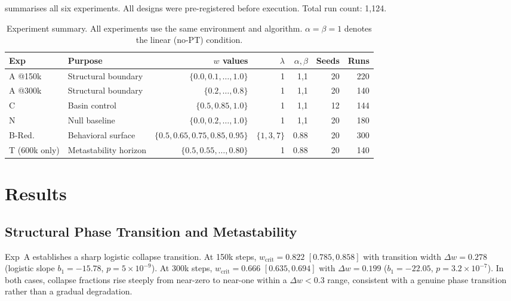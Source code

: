 \documentclass[11pt]{article}
\newcommand{\wcrit}{w_{\mathrm{crit}}}
\begin{document}
 summarises all six experiments.
All designs were pre-registered before execution.
Total run count: 1,124.

\begin{table}[t]
\centering
\caption{Experiment summary. All experiments use the same environment and
algorithm.  $\alpha{=}\beta{=}1$ denotes the linear (no-PT) condition.}
\label{tab:experiments}
\small
\begin{tabular}{llrrrrr}
\toprule
Exp & Purpose & $w$ values & $\lambda$ & $\alpha,\beta$ & Seeds & Runs \\
\midrule
A @150k  & Structural boundary  & $\{0.0, 0.1,\ldots, 1.0\}$ & 1 & 1,1 & 20 & 220 \\
A @300k  & Structural boundary  & $\{0.2,\ldots, 0.8\}$       & 1 & 1,1 & 20 & 140 \\
C        & Basin control        & $\{0.5, 0.85, 1.0\}$        & 1 & 1,1 & 12 & 144 \\
N        & Null baseline        & $\{0.0, 0.2,\ldots, 1.0\}$  & 1 & 1,1 & 20 & 180 \\
B-Red.   & Behavioral surface   & $\{0.5, 0.65, 0.75, 0.85, 0.95\}$ & $\{1,3,7\}$ & 0.88 & 20 & 300 \\
T (600k only) & Metastability horizon & $\{0.5, 0.55,\ldots, 0.80\}$ & 1 & 0.88 & 20 & 140 \\
\bottomrule
\end{tabular}
\end{table}

\section{Results}
\label{sec:results}

\subsection{Structural Phase Transition and Metastability}
\label{sec:results_structural}

Exp~A establishes a sharp logistic collapse transition.
At 150k steps, $\wcrit = 0.822$ $[0.785, 0.858]$ with transition width
$\Delta w = 0.278$ (logistic slope $b_1 = -15.78$, $p = 5 \times 10^{-9}$).
At 300k steps, $\wcrit = 0.666$ $[0.635, 0.694]$ with $\Delta w = 0.199$
($b_1 = -22.05$, $p = 3.2 \times 10^{-7}$).
In both cases, collapse fractions rise steeply from near-zero to near-one
within a $\Delta w < 0.3$ range, consistent with a genuine phase
transition rather than a gradual degradation.
\end{document}
